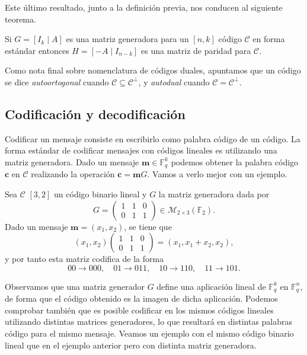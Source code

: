 Este último resultado, junto a la definición previa, nos conducen al siguiente teorema. 

\begin{theorem}
  Si \(G = [I_k \mid A]\) es una matriz generadora para un \([n, k]\) código \(\mathcal C\) en forma estándar entonces \(H = [-A \mid I_{n-k}]\) es una matriz de paridad para \(\mathcal C\).
\end{theorem}

Como nota final sobre nomenclatura de códigos duales, apuntamos que un código se dice \textit{autoortogonal} cuando \(\mathcal C \subseteq \mathcal C^{\perp}\), y \textit{autodual} cuando \(\mathcal C = \mathcal C^{\perp}\).

\subsection{Codificación y decodificación}
\label{subsec:codificacion-descodificacion}

Codificar un mensaje consiste en escribirlo como palabra código de un código.
La forma estándar de codificar mensajes con códigos lineales es utilizando una matriz generadora.
Dado un mensaje \(\mathbf{m} \in \mathbb F_q^k\) podemos obtener la palabra código \(\mathbf{c}\) en \(\mathcal C\) realizando la operación \(\mathbf{c}= \mathbf{m}G\).
Vamos a verlo mejor con un ejemplo.

\begin{example}
  Sea \(\mathcal C\) \([3, 2]\) un código binario lineal y \(G\) la matriz generadora dada por 
  \[
    G = \begin{pmatrix}
      1 & 1 & 0 \\ 0 & 1 & 1
    \end{pmatrix} \in \mathcal M_{2 \times 3}(\mathbb F_2).
  \]
  Dado un mensaje \(\mathbf{m} = (x_1, x_2)\), se tiene que \[(x_1, x_2) \begin{pmatrix}
    1 & 1 & 0 \\ 0 & 1 & 1
  \end{pmatrix} = (x_1, x_1 + x_2, x_2),\] y por tanto esta matriz codifica de la forma \[00 \to 000, \quad 01 \to 011,\quad 10 \to 110,\quad 11 \to 101.\]
\end{example}

Observamos que una matriz generador \(G\) define una aplicación lineal de \(\mathbb F_q^k\) en \(\mathbb F_q^n\), de forma que el código obtenido es la imagen de dicha aplicación.
Podemos comprobar también que es posible codificar en los mismos códigos lineales utilizando distintas matrices generadores, lo que resultará en distintas palabras código para el mismo mensaje.
Veamos un ejemplo con el mismo código binario lineal que en el ejemplo anterior pero con distinta matriz generadora.

